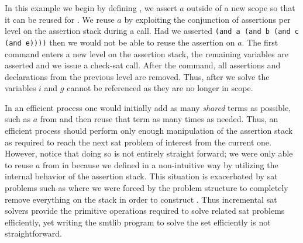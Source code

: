 In this example we begin by defining \pV{}, we assert $a$ outside of a new scope
so that it can be reused for \qV{}. We reuse $a$ by exploiting the conjunction
of assertions per level on the assertion stack during a  call. Had
we asserted \lstinline{(and a (and b (and c (and e))))} then we would not be
able to reuse the assertion on $a$. The first  command enters a new
level on the assertion stack, the remaining variables are asserted and we issue
a check-sat call. After the  command, all assertions and declarations
from the previous level are removed. Thus, after we solve \qV{} the variables
$i$ and $g$ cannot be referenced as they are no longer in scope.

In an efficient process one would initially add as many \emph{shared} terms as
possible, such as $a$ from \pV{} and then reuse that term as many times as
needed. Thus, an efficient process should perform only enough manipulation of
the assertion stack as required to reach the next \ac{sat} problem of interest
from the current one. However, notice that doing so is not entirely straight
forward; we were only able to reuse $a$ from \pV{} in \qV{} because we defined
\pV{} in a non-intuitive way by utilizing the internal behavior of the assertion
stack. This situation is exacerbated by \ac{sat} problems such as \rV{} where we
were forced by the problem structure to completely remove everything on the
stack in order to construct \rV{}. Thus incremental \ac{sat} solvers provide the
primitive operations required to solve related \ac{sat} problems efficiently,
yet writing the \acl{smtlib} program to solve the set efficiently is not
straightforward.


